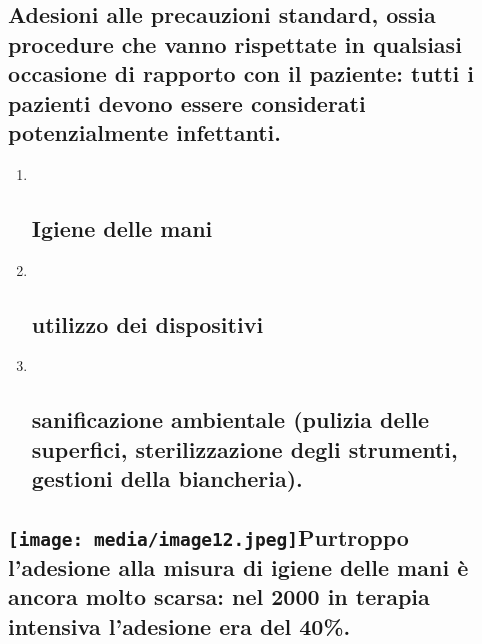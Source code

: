 \documentclass[]{article}
\begin{document}
\begin{enumerate}
  \subsection{\texorpdfstring{Adesioni alle \textbf{precauzioni
  standard}, ossia procedure che vanno rispettate in qualsiasi occasione
  di rapporto con il paziente: tutti i pazienti devono essere
  considerati potenzialmente
  infettanti.}{Adesioni alle precauzioni standard, ossia procedure che vanno rispettate in qualsiasi occasione di rapporto con il paziente: tutti i pazienti devono essere considerati potenzialmente infettanti.}}\label{adesioni-alle-precauzioni-standard-ossia-procedure-che-vanno-rispettate-in-qualsiasi-occasione-di-rapporto-con-il-paziente-tutti-i-pazienti-devono-essere-considerati-potenzialmente-infettanti.}

  \begin{enumerate}
  \def\labelenumii{\arabic{enumii}.}
  \item ~
    \subsection{\texorpdfstring{\textbf{Igiene delle
    mani}}{Igiene delle mani}}\label{igiene-delle-mani}
  \item ~
    \subsection{utilizzo dei
    dispositivi}\label{utilizzo-dei-dispositivi}
  \item ~
    \subsection{\texorpdfstring{sanificazione ambientale (pulizia delle
    \textbf{superfici}, sterilizzazione degli strumenti, gestioni della
    biancheria).}{sanificazione ambientale (pulizia delle superfici, sterilizzazione degli strumenti, gestioni della biancheria).}}\label{sanificazione-ambientale-pulizia-delle-superfici-sterilizzazione-degli-strumenti-gestioni-della-biancheria.}
  \end{enumerate}
\end{enumerate}

\subsection{\texorpdfstring{\protect\texttt{[image: media/image12.jpeg]}Purtroppo
l'adesione alla misura di igiene delle mani è ancora molto scarsa: nel
2000 in terapia intensiva l'adesione era del 40\%.
}{Purtroppo l'adesione alla misura di igiene delle mani è ancora molto scarsa: nel 2000 in terapia intensiva l'adesione era del 40\%. }}\label{purtroppo-ladesione-alla-misura-di-igiene-delle-mani-uxe8-ancora-molto-scarsa-nel-2000-in-terapia-intensiva-ladesione-era-del-40.}
\end{document}
